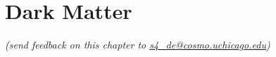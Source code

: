 \chapter{Dark Matter}
\begin{center}
{\small \it (send feedback on this chapter to \href{mailto:s4_de@cosmo.uchicago.edu}{s4\_de@cosmo.uchicago.edu})}
\end{center}
%
%

